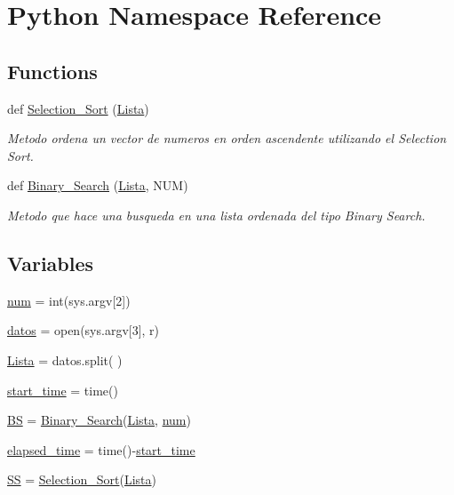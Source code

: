 \hypertarget{namespacePython}{}\section{Python Namespace Reference}
\label{namespacePython}
\subsection*{Functions}
\begin{DoxyCompactItemize}
\item 
def \hyperlink{namespacePython_a4b1ce01cbdd6805546bc11fbcd7f5332}{Selection\+\_\+\+Sort} (\hyperlink{namespacePython_ae46206c5866c80495e52ee5db73af640}{Lista})
\begin{DoxyCompactList}\small\item\em Metodo ordena un vector de numeros en orden ascendente utilizando el Selection Sort. \end{DoxyCompactList}\item 
def \hyperlink{namespacePython_a08edaf56fb0321422e0c5a4f824195cb}{Binary\+\_\+\+Search} (\hyperlink{namespacePython_ae46206c5866c80495e52ee5db73af640}{Lista}, N\+UM)
\begin{DoxyCompactList}\small\item\em Metodo que hace una busqueda en una lista ordenada del tipo Binary Search. \end{DoxyCompactList}\end{DoxyCompactItemize}
\subsection*{Variables}
\begin{DoxyCompactItemize}
\item 
\hyperlink{namespacePython_a480d858dd0b7f6a09a2c0c1fe831d8da}{num} = int(sys.\+argv\mbox{[}2\mbox{]})
\item 
\hyperlink{namespacePython_a6b73bac8be786503797ec7d60767507f}{datos} = open(sys.\+argv\mbox{[}3\mbox{]}, \textquotesingle{}r\textquotesingle{})
\item 
\hyperlink{namespacePython_ae46206c5866c80495e52ee5db73af640}{Lista} = datos.\+split(\textquotesingle{} \textquotesingle{})
\item 
\hyperlink{namespacePython_a870c37a495c63c0f2740e670128c5e8c}{start\+\_\+time} = time()
\item 
\hyperlink{namespacePython_a7ba4f492816e35070eb8a3964d6b428b}{BS} = \hyperlink{namespacePython_a08edaf56fb0321422e0c5a4f824195cb}{Binary\+\_\+\+Search}(\hyperlink{namespacePython_ae46206c5866c80495e52ee5db73af640}{Lista}, \hyperlink{namespacePython_a480d858dd0b7f6a09a2c0c1fe831d8da}{num})
\item 
\hyperlink{namespacePython_a9cd322469f48bbf8cbf94cd42f228a23}{elapsed\+\_\+time} = time()-\/\hyperlink{namespacePython_a870c37a495c63c0f2740e670128c5e8c}{start\+\_\+time}
\item 
\hyperlink{namespacePython_a24d889ae27972167c55c806c36a907ac}{SS} = \hyperlink{namespacePython_a4b1ce01cbdd6805546bc11fbcd7f5332}{Selection\+\_\+\+Sort}(\hyperlink{namespacePython_ae46206c5866c80495e52ee5db73af640}{Lista})
\end{DoxyCompactItemize}


